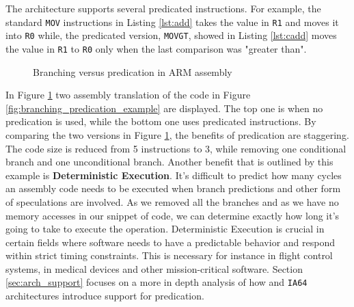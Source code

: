 The \armvs architecture supports several predicated instructions. For example, the standard \texttt{MOV} instructions in Listing \ref{lst:add} takes the value in \texttt{R1} and moves it into \texttt{R0} while, the predicated version, \texttt{MOVGT}, showed in Listing \ref{lst:cadd} moves the value in \texttt{R1} to \texttt{R0} only when the last comparison was "greater than". \\

\begin{figure}[h!]
\centering

\caption{Branching versus predication in ARM assembly}
\label{fig:branching_predication_ARM}
\end{figure}

In Figure \ref{fig:branching_predication_ARM} two assembly translation of the code in Figure \ref{fig:branching_predication_example} are displayed. The top one is when no predication is used, while the bottom one uses predicated instructions. 
By comparing the two versions in Figure \ref{fig:branching_predication_ARM}, the benefits of predication are staggering. The code size is reduced from 5 instructions to 3, while removing one conditional branch and one unconditional branch. Another benefit that is outlined by this example is \textbf{Deterministic Execution}. It's difficult to predict how many cycles an assembly code needs to be executed when branch predictions and other form of speculations are involved. As we removed all the branches and as we have no memory accesses in our snippet of code, we can determine exactly how long it's going to take to execute the operation. Deterministic Execution is crucial in certain fields where software needs to have a predictable behavior and respond within strict timing constraints. This is necessary for instance in flight control systems, in medical devices and other mission-critical software.
Section \ref{sec:arch_support} focuses on a more in depth analysis of how \armvs and \texttt{IA64} architectures introduce support for predication.

